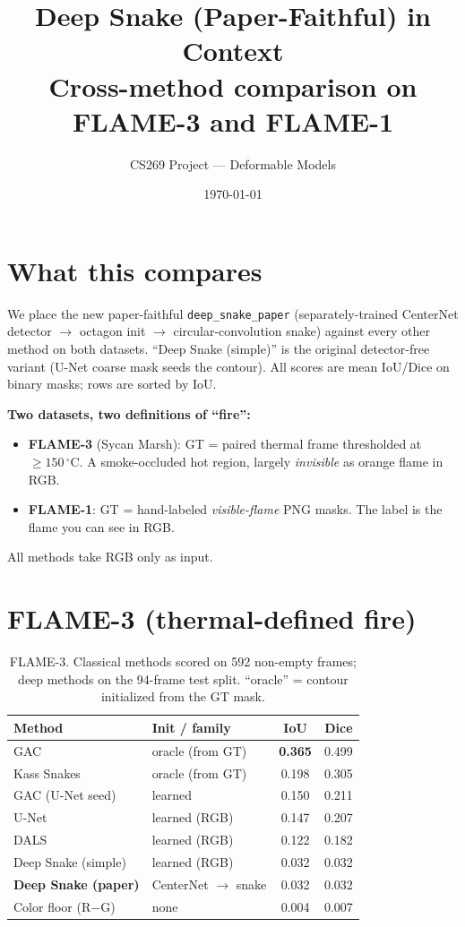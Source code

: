 \documentclass[10pt]{article}
\title{\vspace{-2.5em}Deep Snake (Paper-Faithful) in Context\\
\large Cross-method comparison on FLAME-3 and FLAME-1}
\author{CS269 Project --- Deformable Models}
\date{\today}
\begin{document}
\maketitle
\vspace{-1.5em}

\section{What this compares}

We place the new paper-faithful \texttt{deep\_snake\_paper} (separately-trained
CenterNet detector $\to$ octagon init $\to$ circular-convolution snake) against
every other method on both datasets. ``Deep Snake (simple)'' is the original
detector-free variant (U-Net coarse mask seeds the contour). All scores are mean
IoU/Dice on binary masks; rows are sorted by IoU.

\textbf{Two datasets, two definitions of ``fire'':}
\begin{itemize}
\item \textbf{FLAME-3} (Sycan Marsh): GT = paired thermal frame thresholded at
  $\ge150\,^\circ$C. A smoke-occluded hot region, largely \emph{invisible} as
  orange flame in RGB.
\item \textbf{FLAME-1}: GT = hand-labeled \emph{visible-flame} PNG masks. The label
  is the flame you can see in RGB.
\end{itemize}
All methods take RGB only as input.

\section{FLAME-3 (thermal-defined fire)}

\begin{table}[H]
\centering
\caption{FLAME-3. Classical methods scored on 592 non-empty frames; deep methods on
the 94-frame test split. ``oracle'' = contour initialized from the GT mask.}
\begin{tabular}{llcc}
\toprule
Method & Init / family & IoU & Dice \\
\midrule
GAC                       & oracle (from GT)        & \textbf{0.365} & 0.499 \\
Kass Snakes               & oracle (from GT)        & 0.198 & 0.305 \\
GAC (U-Net seed)          & learned                 & 0.150 & 0.211 \\
U-Net                     & learned (RGB)           & 0.147 & 0.207 \\
DALS                      & learned (RGB)           & 0.122 & 0.182 \\
Deep Snake (simple)       & learned (RGB)           & 0.032 & 0.032 \\
\textbf{Deep Snake (paper)} & CenterNet $\to$ snake & 0.032 & 0.032 \\
Color floor (R$-$G)       & none                    & 0.004 & 0.007 \\
\bottomrule
\end{tabular}
\end{table}
\end{document}
